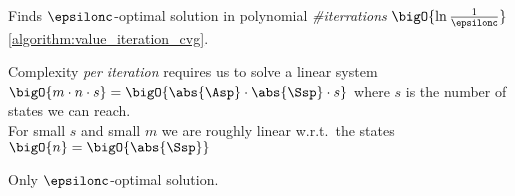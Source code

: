 \begin{sectionbox}\nospacing
 \begin{proslist}
      \item Finds $\epsilonc$-optimal solution in polynomial \textit{\#iterrations} $\bigO{\ln\frac{1}{\epsilonc}}$\cref{algorithm:value_iteration_cvg}.
      \item Complexity \textit{per iteration}
      requires us to solve a linear system $\bigO{m\cdot n\cdot s}=\bigO{\abs{\Asp}\cdot\abs{\Ssp}\cdot s}$ where
      $s$ is the number of states we can reach.\\
      For small $s$ and small $m$ we are roughly linear w.r.t.\ the states $\bigO{n}=\bigO{\abs{\Ssp}}$
    \end{proslist}
 \begin{conslist}
   \item Only $\epsilonc$-optimal solution.
 \end{conslist}
\end{sectionbox}
